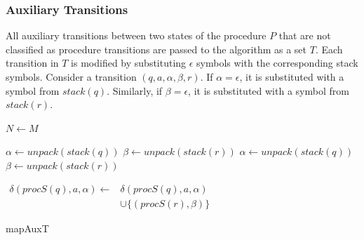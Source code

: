         \subsubsection*{Auxiliary Transitions}
            All auxiliary transitions between two states of the procedure $P$ that are not classified as procedure transitions are passed to the algorithm as a set $T$. Each transition in $T$ is modified by substituting $\epsilon$ symbols with the corresponding stack symbols. Consider a transition $(q, a, \alpha, \beta, r)$. If $\alpha = \epsilon$, it is substituted with a symbol from $stack(q)$. Similarly, if $\beta = \epsilon$, it is substituted with a symbol from $stack(r)$.
        \begin{algorithm}
            \footnotesize
            \DontPrintSemicolon
            \setcounter{AlgoLine}{0}

            $N \leftarrow M$\;
            {
                \If{$\alpha = \epsilon \land \beta = \epsilon$}
                {
                    $\alpha \leftarrow unpack(stack(q))$
                    $\beta \leftarrow unpack(stack(r))$
                }\uElseIf{$\alpha = \epsilon \land \beta \neq \epsilon$}
                {
                    $\alpha \leftarrow unpack(stack(q))$
                }\ElseIf{$\alpha \neq \epsilon \land \beta = \epsilon$}
                {
                    $\beta \leftarrow unpack(stack(r))$
                }

                $\begin{aligned}\delta(procS(q), a, \alpha) \leftarrow &\delta(procS(q), a, \alpha)\\
                    & \cup \{(procS(r), \beta)\}
                \end{aligned}$
            }


            \normalsize
            \caption{mapAuxT}
        \end{algorithm}

